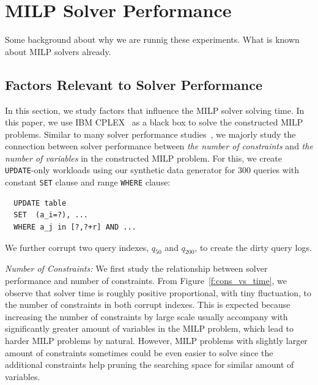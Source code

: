 \section{MILP Solver Performance}
\label{app:solvtime}

Some background about why we are runnig these experiments.  What is known about MILP solvers already.

\subsection{Factors Relevant to Solver Performance}

In this section, we study factors that influence the MILP solver solving time. In this paper, we
use IBM CPLEX~\cite{cplex2014v12} as a black box to solve the constructed MILP problems.   Similar to many solver performance studies~\cite{atamturk2005integer, meindl2012analysis, gearhart2013comparison}, 
we majorly study the connection between solver performance between \textit{the number of constraints} and \textit{the number of variables} in the constructed MILP problem. For this, we create \texttt{UPDATE}-only workloads using our synthetic data generator for 300 queries with constant \texttt{SET} clause and range \texttt{WHERE} clause: 

{\scriptsize
\begin{verbatim}
  UPDATE table
  SET  (a_i=?), ...
  WHERE a_j in [?,?+r] AND ...
\end{verbatim}
}
We further corrupt two query indexes, $q_{50}$ and $q_{200}$, to create the dirty query logs.    


\smallskip
\emph{Number of Constraints: } We first study the relationship between solver performance and number of constraints.   From Figure~\ref{f:cons_vs_time}, we observe that solver time is roughly positive proportional, with tiny fluctuation, to the number of constraints in both corrupt indexes. This is expected because increasing the number of constraints by large scale usually accompany with significantly greater amount of variables in the MILP problem, which lead to harder MILP problems by natural. However, MILP problems  with slightly larger amount of constraints sometimes could be even easier to solve since the additional constraints help pruning the searching space for similar amount of variables.

